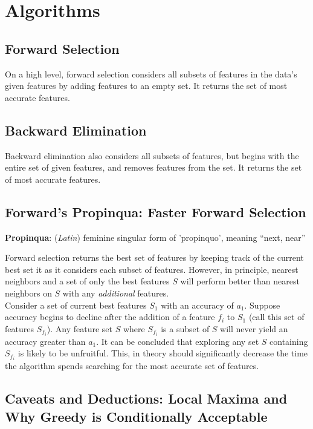 \documentclass{article}
\begin{document}
\section{Algorithms}
\subsection{Forward Selection}
On a high level, forward selection considers all subsets of features in the
data's given features by adding features to an empty set. It returns the set of
most accurate features.

\subsection{Backward Elimination}
Backward elimination also considers all subsets of features, but begins with the
entire set of given features, and removes features from the set. It returns the
set of most accurate features.

\subsection{Forward's Propinqua: Faster Forward Selection}
\textbf{Propinqua}: (\textit{Latin}) feminine singular form of 'propinquo',
meaning ``next, near'' 

Forward selection returns the best set of features by keeping track of the
current best set it as it considers each subset of features. However, in
principle, nearest neighbors and a set of only the best features $S$ will perform
better than nearest neighbors on $S$ with any \textit{additional} features. \\ 

Consider a set of current best features $S_1$ with an accuracy of $a_1$. Suppose
accuracy begins to decline after the addition of a feature $f_i$ to $S_1$ (call
this set of features $S_{f_i}$). Any feature set $S$ where $S_{f_i}$ is a
subset of $S$ will never yield an accuracy greater than $a_1$. It can be concluded
that exploring any set $S$ containing $S_{f_i}$ is likely to be unfruitful.
This, in theory should significantly decrease the time the algorithm spends
searching for the most accurate set of features. \\

\subsection{Caveats and Deductions: Local Maxima and Why Greedy is Conditionally Acceptable}
\end{document}
